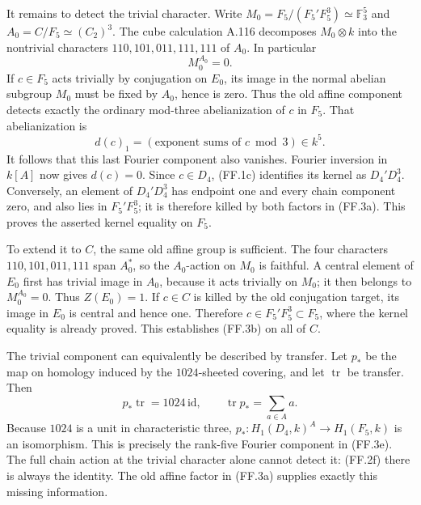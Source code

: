 It remains to detect the trivial character. Write
$M_0=F_5/(F_5'F_5^3)\simeq\mathbb F_3^5$ and
$A_0=C/F_5\simeq(C_2)^3$. The cube calculation A.116
decomposes $M_0\otimes k$ into the nontrivial characters
$110,101,011,111,111$ of $A_0$. In particular
\[
                              M_0^{A_0}=0.
 \tag{FF.3d}
\]
If $c\in F_5$ acts trivially by conjugation on $E_0$, its
image in the normal abelian subgroup $M_0$ must be fixed
by $A_0$, hence is zero. Thus the old affine component
detects exactly the ordinary mod-three abelianization
of $c$ in $F_5$. That abelianization is
\[
             d(c)_1=(\text{exponent sums of }c\bmod3)
                         \in k^5.
 \tag{FF.3e}
\]
It follows that this last Fourier component also vanishes.
Fourier inversion in $k[A]$ now gives $d(c)=0$.
Since $c\in D_4$, (FF.1c) identifies its kernel as
$D_4'D_4^3$. Conversely, an element of $D_4'D_4^3$
has endpoint one and every chain component zero, and
also lies in $F_5'F_5^3$; it is therefore killed by both
factors in (FF.3a). This proves the asserted kernel equality
on $F_5$.

To extend it to $C$, the same old affine group is sufficient.
The four characters $110,101,011,111$ span $A_0^*$, so the
$A_0$-action on $M_0$ is faithful. A central element of $E_0$
first has trivial image in $A_0$, because it acts trivially
on $M_0$; it then belongs to $M_0^{A_0}=0$. Thus
$Z(E_0)=1$. If $c\in C$ is killed by the old conjugation
target, its image in $E_0$ is central and hence one. Therefore
$c\in F_5'F_5^3\subset F_5$, where the kernel equality is
already proved. This establishes (FF.3b) on all of $C$.

The trivial component can equivalently be described by
transfer. Let $p_*$ be the map on homology induced by
the $1024$-sheeted covering, and let $\operatorname{tr}$
be transfer. Then
\[
 p_*\operatorname{tr}=1024\,\mathrm{id},\qquad
 \operatorname{tr}p_*=\sum_{a\in A}a.
 \tag{FF.3f}
\]
Because $1024$ is a unit in characteristic three,
$p_*:H_1(D_4,k)^A\to H_1(F_5,k)$ is an isomorphism.
This is precisely the rank-five Fourier component in
(FF.3e). The full chain action at the trivial character
alone cannot detect it: (FF.2f) there is always the
identity. The old affine factor in (FF.3a) supplies
exactly this missing information.

